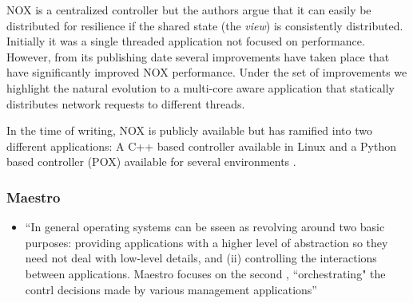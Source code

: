 \begin{itemize}
NOX is a centralized controller  but the authors argue that it can easily be distributed for resilience if the shared state (the \emph{view}) is consistently distributed. 
Initially it was a single threaded application not focused on
performance. However, from its publishing date 
several improvements have taken place
\cite{Tootoonchian:2012uia,zen-doc-thesis} that have significantly improved
NOX performance. Under the set of improvements we highlight the
natural evolution to a multi-core aware application
that statically distributes network requests to different threads. 

In the time of writing, NOX is publicly available but has ramified into
two different applications: A C++ based controller available in
Linux and a Python  based controller (POX) available for
several environments \cite{nox}.

\subsubsection{Maestro}
\begin{itemize}
\item ``In general operating systems can be sseen as revolving around two basic purposes: providing applications with a higher level of abstraction so they need not deal with low-level details, and (ii) controlling the interactions between applications. Maestro focuses on the second , ``orchestrating" the contrl decisions made by various management applications''
\end{itemize}


\end{itemize}
